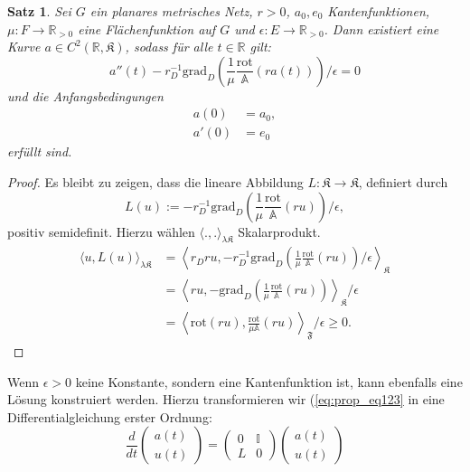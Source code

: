 \documentclass[11pt,a4paper,leqno]{report}
\newtheorem{proposition}{Satz}[chapter]
\numberwithin{equation}{chapter}
\begin{document}
\begin{proposition}
	Sei \( G \) ein planares metrisches Netz, \( r > 0 \), \( a_0, e_0 \) Kantenfunktionen, \( \mu: F \to \mathbb{R}_{>0}\) eine Flächenfunktion auf \(G\) und \( \epsilon: E \to \mathbb{R}_{>0}\). Dann existiert eine Kurve \( a \in C^2(\mathbb{R}, \mathfrak{K}) \), sodass für alle \( t \in \mathbb{R} \) gilt:
	\begin{equation}
		a''(t) - r_D^{-1} \mathrm{grad}_D \left( \frac{1}{\mu} \frac{\mathrm{rot}}{\mathbb{A}} \left( r a(t) \right) \right) / \epsilon = 0\label{eq:prop_eq123}
	\end{equation}
	und die Anfangsbedingungen
	\begin{align}
		a(0) &= a_0, \\
		a'(0) &= e_0
	\end{align}
	erfüllt sind.
\end{proposition}
\begin{proof}
	Es bleibt zu zeigen, dass die lineare Abbildung \( L : \mathfrak{K} \to \mathfrak{K} \), definiert durch
	\[
	L(u) := -r_D^{-1} \mathrm{grad}_D \left( \frac{1}{\mu} \frac{\mathrm{rot}}{\mathbb{A}} \left( r u \right) \right) / \epsilon,
	\]
	positiv semidefinit. Hierzu wählen $\langle .,. \rangle_{\lambda\mathfrak{K}}$ Skalarprodukt.
	\begin{align*}
		\langle u, L(u) \rangle_{\lambda\mathfrak{K}}
		&= \left\langle r_Dru, -r_D^{-1} \mathrm{grad}_D \left( \frac{1}{\mu} \frac{\mathrm{rot}}{\mathbb{A}} \left( r u \right) \right) / \epsilon \right\rangle_{\mathfrak{K}} \\
		&= \left\langle r u, - \mathrm{grad}_D \left( \frac{1}{\mu} \frac{\mathrm{rot}}{\mathbb{A}}\left( r u \right) \right) \right\rangle_{\mathfrak{K}} / \epsilon \\
		&= \left\langle \mathrm{rot} (r u), \frac{\mathrm{rot}}{\mu\mathbb{A}}\left( r u \right) \right\rangle_{\mathfrak{F}} / \epsilon \geq 0.
	\end{align*}
\end{proof}
\noindent
Wenn \(\epsilon > 0\) keine Konstante, sondern eine Kantenfunktion ist, kann ebenfalls eine Lösung konstruiert werden. Hierzu transformieren wir (\eqref{eq:prop_eq123} in eine Differentialgleichung erster Ordnung:
\begin{equation}
	\frac{d}{dt}
	\begin{pmatrix}
		a(t) \\
		u(t)
	\end{pmatrix}
	=
	\begin{pmatrix}
		0 & \mathbb{I} \\
		L & 0
	\end{pmatrix}
	\begin{pmatrix}
		a(t) \\
		u(t)
	\end{pmatrix}
\end{equation}
\end{document}
